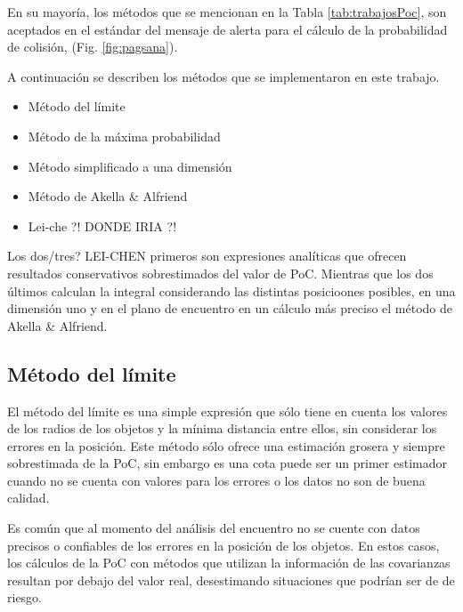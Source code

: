 En su mayor\'ia, los m\'etodos que se mencionan en la Tabla \ref{tab:trabajosPoc}, son aceptados en el est\'andar del mensaje de alerta para el c\'alculo de la probabilidad de colisi\'on, (Fig. \ref{fig:pagsana}).

% 
A continuaci\'on se describen los m\'etodos que se implementaron en este trabajo. 

\begin{itemize}
 \item M\'etodo del l\'imite
 \item M\'etodo de la m\'axima probabilidad
 \item M\'etodo simplificado a una dimensi\'on
 \item M\'etodo de Akella \& Alfriend \citep{akellaAlfriend}
 \item Lei-che ?! DONDE IRIA ?! 
\end{itemize}

Los dos/tres? LEI-CHEN primeros son expresiones anal\'iticas que ofrecen resultados conservativos sobrestimados del valor de PoC. Mientras que los dos \'ultimos calculan la integral considerando las distintas posicioones posibles, en una dimensi\'on uno y en el plano de encuentro en un c\'alculo m\'as preciso el m\'etodo de Akella \& Alfriend.

\subsection{M\'etodo del l\'imite}
El m\'etodo del l\'imite es una simple expresi\'on que s\'olo tiene en cuenta los valores de los radios de los objetos y la m\'inima distancia entre ellos, sin considerar los errores en la posici\'on. Este m\'etodo s\'olo ofrece una estimaci\'on grosera y siempre sobrestimada de la PoC, sin embargo es una cota puede ser un primer estimador cuando no se cuenta con valores para los errores o los datos no son de buena calidad. 

Es com\'un que al momento del an\'alisis  del encuentro no se cuente con datos precisos o confiables de los errores en la posici\'on de los objetos. En estos casos, los c\'alculos de la PoC con m\'etodos que utilizan la informaci\'on de las covarianzas resultan por debajo del valor real, desestimando situaciones que podr\'ian ser de de riesgo. 

